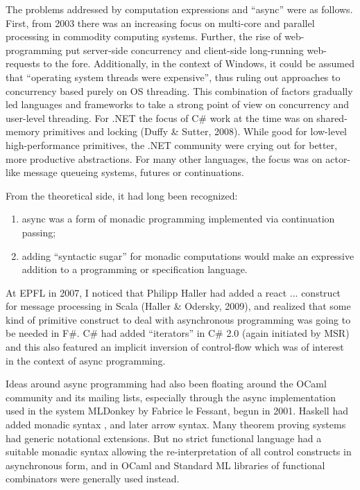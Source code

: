 \documentclass[acmsmall,review]{acmart}\settopmatter{printfolios=true,printccs=false,printacmref=false}
\begin{document}
The problems addressed by computation expressions and “async” were as follows.  First, from 2003 there was an increasing focus on multi-core and parallel processing in commodity computing systems. Further, the rise of web-programming put server-side concurrency and client-side long-running web-requests to the fore. Additionally, in the context of Windows, it could be assumed that “operating system threads were expensive”, thus ruling out approaches to concurrency based purely on OS threading.  This combination of factors gradually led languages and frameworks to take a strong point of view on concurrency and user-level threading.  For .NET the focus of C\# work at the time was on shared-memory primitives and locking (Duffy \& Sutter, 2008). While good for low-level high-performance primitives, the .NET community were crying out for better, more productive abstractions.  For many other languages, the focus was on actor-like message queueing systems, futures or continuations.  

From the theoretical side, it had long been recognized:

\begin{enumerate}
\item async was a form of monadic programming implemented via continuation passing;
\item adding “syntactic sugar” for monadic computations would make an expressive addition to a programming or specification language.
\end{enumerate}


At EPFL in 2007, I noticed that Philipp Haller had added a react { ... } construct for message processing in Scala (Haller \& Odersky, 2009), and realized that some kind of primitive construct to deal with asynchronous programming was going to be needed in F\#.  C\# had added “iterators” in C\# 2.0 (again initiated by MSR) and this also featured an implicit inversion of control-flow which was of interest in the context of async programming.

Ideas around async programming had also been floating around the OCaml community and its mailing lists, especially through the async implementation used in the system MLDonkey by Fabrice le Fessant, begun in 2001.  Haskell had added monadic syntax , and later arrow syntax.  Many theorem proving systems had generic notational extensions. But no strict functional language had a suitable monadic syntax allowing the re-interpretation of all control constructs in asynchronous form, and in OCaml and Standard ML libraries of functional combinators were generally used instead.  
\end{document}
